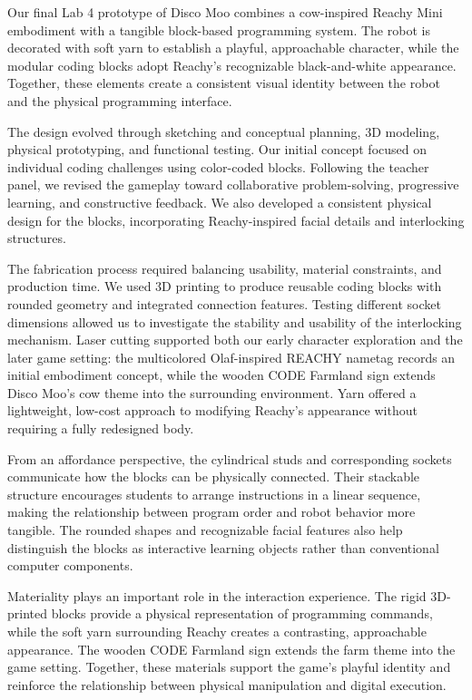 \documentclass[conference]{IEEEtran}
\begin{document}
Our final Lab 4 prototype of Disco Moo combines a cow-inspired Reachy Mini embodiment with a tangible block-based programming system. The robot is decorated with soft yarn to establish a playful, approachable character, while the modular coding blocks adopt Reachy's recognizable black-and-white appearance. Together, these elements create a consistent visual identity between the robot and the physical programming interface.

The design evolved through sketching and conceptual planning, 3D modeling, physical prototyping, and functional testing. Our initial concept focused on individual coding challenges using color-coded blocks. Following the teacher panel, we revised the gameplay toward collaborative problem-solving, progressive learning, and constructive feedback. We also developed a consistent physical design for the blocks, incorporating Reachy-inspired facial details and interlocking structures.

The fabrication process required balancing usability, material constraints, and production time. We used 3D printing to produce reusable coding blocks with rounded geometry and integrated connection features. Testing different socket dimensions allowed us to investigate the stability and usability of the interlocking mechanism. Laser cutting supported both our early character exploration and the later game setting: the multicolored Olaf-inspired REACHY nametag records an initial embodiment concept, while the wooden CODE Farmland sign extends Disco Moo's cow theme into the surrounding environment. Yarn offered a lightweight, low-cost approach to modifying Reachy's appearance without requiring a fully redesigned body.

From an affordance perspective, the cylindrical studs and corresponding sockets communicate how the blocks can be physically connected. Their stackable structure encourages students to arrange instructions in a linear sequence, making the relationship between program order and robot behavior more tangible. The rounded shapes and recognizable facial features also help distinguish the blocks as interactive learning objects rather than conventional computer components.

Materiality plays an important role in the interaction experience. The rigid 3D-printed blocks provide a physical representation of programming commands, while the soft yarn surrounding Reachy creates a contrasting, approachable appearance. The wooden CODE Farmland sign extends the farm theme into the game setting. Together, these materials support the game's playful identity and reinforce the relationship between physical manipulation and digital execution.
\end{document}
